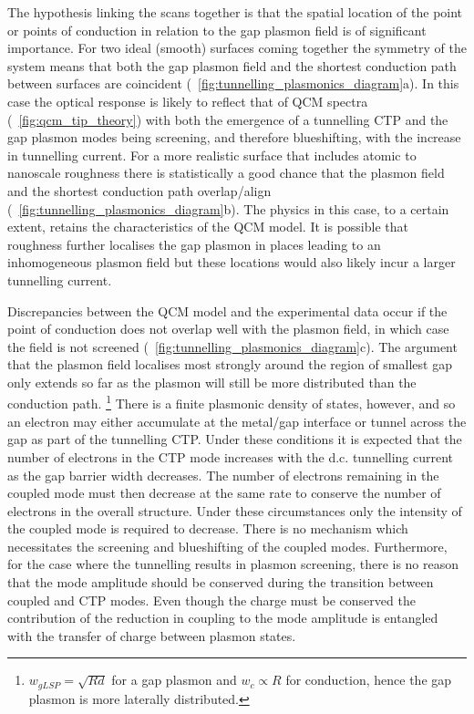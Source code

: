 \documentclass[a4paper]{article}
\begin{document}
The hypothesis linking the scans together is that the spatial location of the point or points of conduction in relation to the gap plasmon field is of significant importance. For two ideal (smooth) surfaces coming together the symmetry of the system means that both the gap plasmon field and the shortest conduction path between surfaces are coincident (\figurename~\ref{fig:tunnelling_plasmonics_diagram}a). In this case the optical response is likely to reflect that of QCM spectra \cite{savage2012} (\figurename~\ref{fig:qcm_tip_theory}) with both the emergence of a tunnelling CTP and the gap plasmon modes being screening, and therefore blueshifting, with the increase in tunnelling current.
For a more realistic surface that includes atomic to nanoscale roughness there is statistically a good chance that the plasmon field and the shortest conduction path {\color{red}overlap/align} (\figurename~\ref{fig:tunnelling_plasmonics_diagram}b). The physics in this case, to a certain extent, retains the characteristics of the QCM model. It is possible that roughness further localises the gap plasmon in places leading to an inhomogeneous plasmon field but these locations would also likely incur a larger tunnelling current.

Discrepancies between the QCM model and the experimental data occur if the point of conduction does not overlap well with the plasmon field, in which case the field is not screened (\figurename~\ref{fig:tunnelling_plasmonics_diagram}c). The argument that the plasmon field localises most strongly around the region of smallest gap only extends so far as the plasmon will still be more distributed than the conduction path.%
\footnote{$w_{gLSP}=\sqrt{Rd}$ for a gap plasmon and $w_{c}\propto R$ for conduction, hence the gap plasmon is more laterally distributed.}
There is a finite plasmonic density of states, however, and so an electron may either accumulate at the metal/gap interface or tunnel across the gap as part of the tunnelling CTP. Under these conditions it is expected that the number of electrons in the CTP mode increases with the d.c. tunnelling current as the gap barrier width decreases. The number of electrons remaining in the coupled mode must then decrease at the same rate to conserve the number of electrons in the overall structure. Under these circumstances only the intensity of the coupled mode is required to decrease. There is no mechanism which necessitates the screening and blueshifting of the coupled modes.
Furthermore, for the case where the tunnelling results in plasmon screening, there is no reason that the mode amplitude should be conserved during the transition between coupled and CTP modes. Even though the charge must be conserved the contribution of the reduction in coupling to the mode amplitude is entangled with the transfer of charge between plasmon states.
\end{document}
